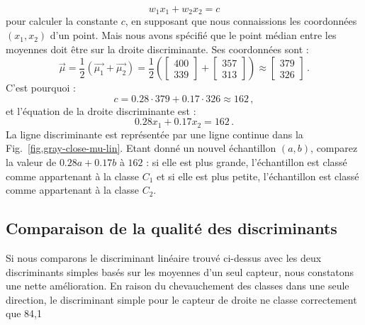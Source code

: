 \[
w_1x_1 + w_2x_2 = c
\]
pour calculer la constante $c$, en supposant que nous connaissions les coordonnées $(x_1,x_2)$ d'un point. Mais nous avons spécifié que le point médian entre les moyennes doit être sur la droite discriminante. Ses coordonnées sont :
\[
\vec{\mu} = \frac{1}{2}(\vec{\mu_1} + \vec{\mu_2}) = \frac{1}{2}\left( \left[ \begin{array}{c} 400\\339 \end{array}\right] + \left[ \begin{array}{c} 357\\313 \end{array}\right] \right) \approx \left[ \begin{array}{c} 379\\326 \end{array}\right]\,.
\]
C'est pourquoi :
\[
c = 0.28 \cdot 379 + 0.17\cdot 326 \approx 162\,,
\]
et l'équation de la droite discriminante est :
\[
0.28 x_1 + 0.17 x_2 = 162\,.
\]
La ligne discriminante est représentée par une ligne continue dans la Fig.~\ref{fig.gray-close-mu-lin}. Etant donné un nouvel échantillon $(a,b)$, comparez la valeur de $0.28a + 0.17b$ à $162$ : si elle est plus grande, l'échantillon est classé comme appartenant à la classe $C_1$ et si elle est plus petite, l'échantillon est classé comme appartenant à la classe $C_2$. 

\subsection{Comparaison de la qualité des discriminants}

Si nous comparons le discriminant linéaire trouvé ci-dessus avec les deux discriminants simples basés sur les moyennes d'un seul capteur, nous constatons une nette amélioration. En raison du chevauchement des classes dans une seule direction, le discriminant simple pour le capteur de droite ne classe correctement que 84,1 %

